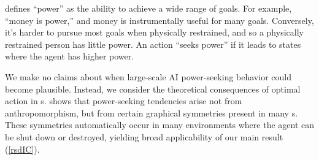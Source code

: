  defines ``power'' as the ability to achieve a wide range of goals. For example, ``money is power,'' and money is instrumentally useful for many goals. Conversely, it's harder to pursue most goals when physically restrained, and so a physically restrained person has little power. An action ``seeks power'' if it leads to states where the agent has higher power. 

We make no claims about when large-scale AI power-seeking behavior could become plausible. Instead, we consider the theoretical consequences of optimal action in {\mdp}s.  shows that power-seeking tendencies arise not from anthropomorphism, but from certain graphical symmetries present in many {\mdp}s. These symmetries automatically occur in many environments where the agent can be shut down or destroyed, yielding broad applicability of our main result (\cref{rsdIC}).
